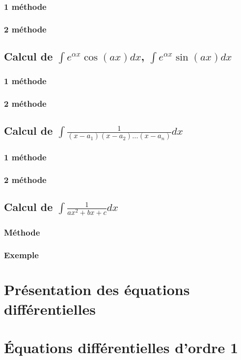 \documentclass[12pt,a4paper,french]{book}
\begin{document}
			\subsubsection{1 méthode}
			\subsubsection{2 méthode}
		\subsection{Calcul de $\int e^{\alpha x}\cos(ax)dx$, $\int e^{\alpha x}\sin(ax)dx$}
			\subsubsection{1 méthode}
			\subsubsection{2 méthode}
		\subsection{Calcul de $\int \frac{1}{(x-a_1)(x-a_2)\dots(x-a_n)}dx$}
			\subsubsection{1 méthode}
			\subsubsection{2 méthode}
		\subsection{Calcul de $\int \frac{1}{ax^{2}+bx+c}dx$}
			\subsubsection{Méthode}
			\subsubsection{Exemple}
	\section{Présentation des équations différentielles}
	\section{Équations différentielles d'ordre 1}
\end{document}
